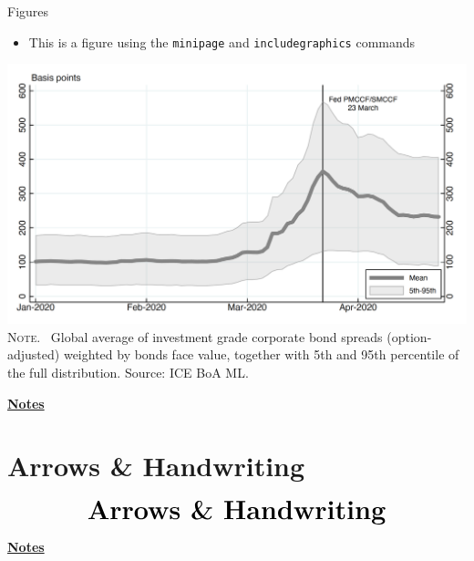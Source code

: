 \documentclass[10pt]{beamer}
\begin{document}
\begin{frame}
	{Figures}
	\begin{itemize}
		\item This is a figure using the \texttt{minipage} and \texttt{includegraphics} commands
	\end{itemize}
	\begin{center}
		\begin{minipage}[b]{.6\textwidth}
			\includegraphics[width=\textwidth]{figure}\\
			\tiny{{\scshape Note}. \ Global average of investment grade corporate bond spreads (option-adjusted) weighted by bonds face value, together with 5th and 95th percentile of the full distribution. Source: ICE BoA ML.}
		\end{minipage}
	\end{center}
\end{frame}
\begin{flushleft}
	\underline{\textbf{Notes}}\setlength{\parskip}{.15cm}\notesize\newline\par
\end{flushleft}


\section{Arrows \& Handwriting}
\begin{frame}
	\begin{eqnarray*}
		&\text{{\huge \textbf{Arrows \& Handwriting}}}\\
	\end{eqnarray*}
\end{frame}
\begin{flushleft}
	\underline{\textbf{Notes}}\setlength{\parskip}{.15cm}\notesize\newline\par
\end{flushleft}
\end{document}
